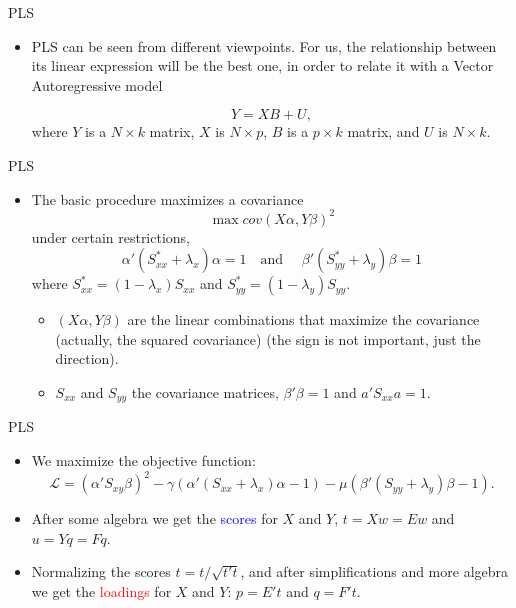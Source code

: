 \documentclass{beamer}
\newcommand{\?}{?`}
\begin{document}
\begin{frame}{PLS}
  \begin{itemize}
  \item PLS can be seen from different viewpoints. For us, the relationship between its linear expression
  will be the best one, in order to relate it with a Vector Autoregressive model

   \begin{displaymath}
      Y=XB+U,
    \end{displaymath}
    \bigskip
    where $Y$ is a $N\times k$ matrix, $X$ is $N\times p$, $B$ is a
     $p\times k$ matrix, and  $U$ is  $N\times k$.
  \end{itemize}
\end{frame}



\begin{frame}{PLS}
  \begin{itemize}
  \item The basic procedure maximizes a covariance
    \begin{displaymath}
      \max cov(X\alpha,Y\beta)^2
    \end{displaymath}
    under certain restrictions,
    \begin{displaymath}
      \alpha'(S_{xx}^{*}+\lambda_x)\alpha = 1 \quad \text{and } \quad
      \beta'(S_{yy}^{*}+\lambda_y)\beta = 1
    \end{displaymath}
    where $S_{xx}^{*}=(1-\lambda_x)S_{xx}$ and
    $S_{yy}^{*}=(1-\lambda_y)S_{yy}$.
    \begin{itemize}
    \item $(X\alpha,Y\beta)$ are the linear combinations that  maximize the covariance (actually, the squared covariance)
    (the sign is not important, just the direction).
    \item $S_{xx}$ and $S_{yy}$ the covariance matrices, $\beta'\beta=1$ and $a'S_{xx}a=1$.
    \end{itemize}
  \end{itemize}
\end{frame}

\begin{frame}{PLS}
  \begin{itemize}
  \item We maximize the objective function:
    \begin{displaymath}
      \mathcal{L}=
      (\alpha'S_{xy}\beta)^2-\gamma(\alpha'(S_{xx}+\lambda_x)\alpha-1)
      - \mu(\beta'(S_{yy}+\lambda_y)\beta-1).
    \end{displaymath}
  \item After some algebra we get the {\textcolor{blue}{scores}} for  $X$ and
    $Y$, $t=Xw=Ew$ and $u=Yq=Fq$.
  \item  Normalizing the scores   $t=t/\sqrt{t't}$, and after simplifications and more algebra we get
  the \textcolor{red}{loadings} for  $X$ and $Y$: $p=E't$ and $q=F't$.
  \end{itemize}
\end{frame}
\end{document}
